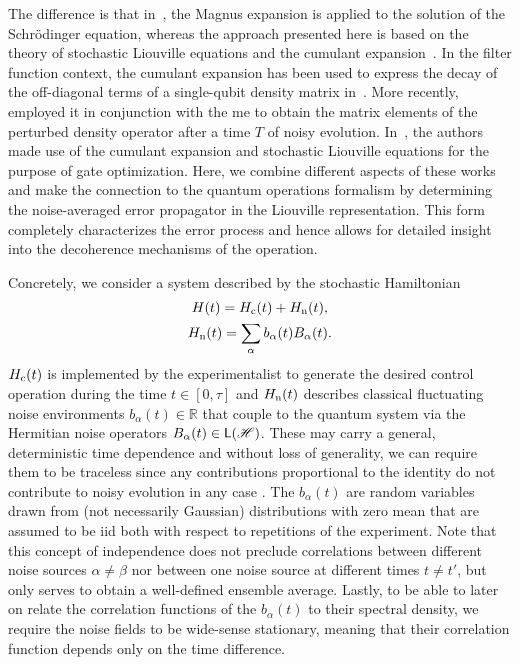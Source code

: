 The difference is that in~, the Magnus expansion is applied to the solution of the Schr\"odinger equation, whereas the approach presented here is based on the theory of stochastic Liouville equations and the cumulant expansion~\cite{Kubo1962,Kubo1963}.
In the filter function context, the cumulant expansion has been used to express the decay of the off-diagonal terms of a single-qubit density matrix in~.
More recently,~\citeauthor{Paz-Silva2014} employed it in conjunction with the \gls{me} to obtain the matrix elements of the perturbed density operator after a time $T$ of noisy evolution.
In~, the authors made use of the cumulant expansion and stochastic Liouville equations for the purpose of gate optimization.
Here, we combine different aspects of these works and make the connection to the quantum operations formalism by determining the noise-averaged error propagator in the Liouville representation.
This form completely characterizes the error process and hence allows for detailed insight into the decoherence mechanisms of the operation.

Concretely, we consider a system described by the stochastic Hamiltonian
\begin{gather}
    H(t) = H_{\mathrm{c}}(t) + H_{\mathrm{n}}(t),\label{eq:ff:hamiltonian} \\
    H_{\mathrm{n}}(t) = \sum_\alpha b_\alpha(t) B_\alpha(t). \label{eq:ff:hamiltonian:noise}
\end{gather}
$H_{\mathrm{c}}(t)$ is implemented by the experimentalist to generate the desired control operation during the time $t\in [0, \tau]$ and $H_{\mathrm{n}}(t)$ describes classical fluctuating noise environments $b_\alpha(t)\in\mathbb{R}$ that couple to the quantum system via the Hermitian noise operators $B_\alpha(t)\in\mathsf{L}(\mathscr{H})$.
These may carry a general, deterministic time dependence and without loss of generality, we can require them to be traceless since any contributions proportional to the identity do not contribute to noisy evolution in any case .
The $b_\alpha(t)$ are random variables drawn from (not necessarily Gaussian) distributions with zero mean that are assumed to be \gls{iid} both with respect to repetitions of the experiment.
Note that this concept of independence does not preclude correlations between different noise sources $\alpha\neq\beta$ nor between one noise source at different times $t\neq t'$, but only serves to obtain a well-defined ensemble average.
Lastly, to be able to later on relate the correlation functions of the $b_\alpha(t)$ to their spectral density, we require the noise fields to be wide-sense stationary, meaning that their correlation function depends only on the time difference.


